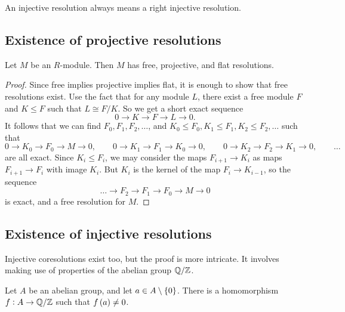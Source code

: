 An injective resolution always means a right injective resolution.

\subsection{Existence of projective resolutions}

\begin{proposition}
Let $ M $ be an $ R $-module. Then $ M $ has free, projective, and flat resolutions.
\end{proposition}

\begin{proof}
Since free implies projective implies flat, it is enough to show that free resolutions exist. Use the fact that for any module $ L $, there exist a free module $ F $ and $ K \le F $ such that $ L \cong F / K $. So we get a short exact sequence
$$ 0 \to K \to F \to L \to 0. $$
It follows that we can find $ F_0, F_1, F_2, \dots $, and $ K_0 \le F_0, K_1 \le F_1, K_2 \le F_2, \dots $ such that
$$ 0 \to K_0 \to F_0 \to M \to 0, \qquad 0 \to K_1 \to F_1 \to K_0 \to 0, \qquad 0 \to K_2 \to F_2 \to K_1 \to 0, \qquad \dots $$
are all exact. Since $ K_i \le F_i $, we may consider the maps $ F_{i + 1} \to K_i $ as maps $ F_{i + 1} \to F_i $ with image $ K_i $. But $ K_i $ is the kernel of the map $ F_i \to K_{i - 1} $, so the sequence
$$ \dots \to F_2 \to F_1 \to F_0 \to M \to 0 $$
is exact, and a free resolution for $ M $.
\end{proof}

\subsection{Existence of injective resolutions}

Injective coresolutions exist too, but the proof is more intricate. It involves making use of properties of the abelian group $ \mathbb{Q} / \mathbb{Z} $.

\begin{proposition}
Let $ A $ be an abelian group, and let $ a \in A \setminus \cbr{0} $. There is a homomorphism $ f : A \to \mathbb{Q} / \mathbb{Z} $ such that $ f\br{a} \ne 0 $.
\end{proposition}

